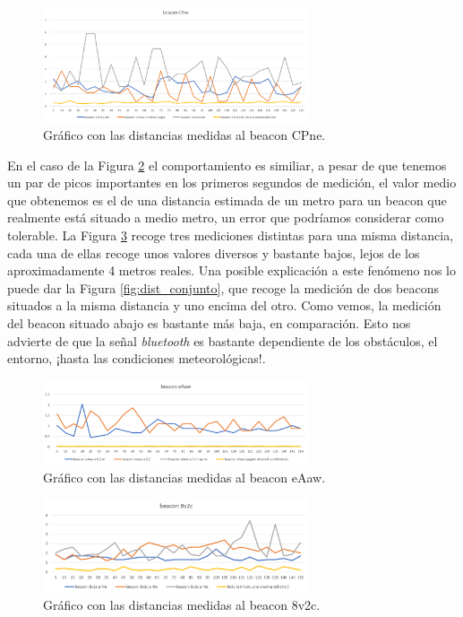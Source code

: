 \begin{figure}[t]
	\centering
	\includegraphics[width=0.7\textwidth]{Imagenes/Descripciondeltrabajo/dist_CPne}
	\caption{Gráfico con las distancias medidas al beacon CPne. }
	\label{fig:dist_CPne}
\end{figure}

En el caso de la Figura \ref{fig:dist_eAaw} el comportamiento es similiar, a pesar de que tenemos un par de picos importantes en los primeros segundos de medición, el valor medio que obtenemos es el de una distancia estimada de un metro para un beacon que realmente está situado a medio metro, un error que podríamos considerar como tolerable. La Figura \ref{fig:dist_8v2c} recoge tres mediciones distintas para una misma distancia, cada una de ellas recoge unos valores diversos y bastante bajos, lejos de los aproximadamente 4 metros reales. Una posible explicación a este fenómeno nos lo puede dar la Figura \ref{fig:dist_conjunto}, que recoge la medición de dos beacons situados a la misma distancia y uno encima del otro. Como vemos, la medición del beacon situado abajo es bastante más baja, en comparación. Esto nos advierte de que la señal \textit{bluetooth} es bastante dependiente de los obstáculos, el entorno, ¡hasta las condiciones meteorológicas!. 


\begin{figure}[t]
	\centering
	\includegraphics[width=0.7\textwidth]{Imagenes/Descripciondeltrabajo/dist_eAaw}
	\caption{Gráfico con las distancias medidas al beacon eAaw. }
	\label{fig:dist_eAaw}
\end{figure}


\begin{figure}[t]
	\centering
	\includegraphics[width=0.7\textwidth]{Imagenes/Descripciondeltrabajo/dist_8v2c}
	\caption{Gráfico con las distancias medidas al beacon 8v2c. }
	\label{fig:dist_8v2c}
\end{figure}

